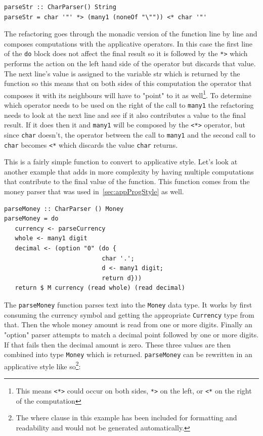 \begin{lstlisting}[frame=tlrb]
parseStr :: CharParser() String
parseStr = char '"' *> (many1 (noneOf "\"")) <* char '"'
\end{lstlisting}

The refactoring goes through the monadic version of the function line by line and composes computations with the applicative operators. In this case the first line of the \texttt{do} block does not affect the final result so it is followed by the \texttt{*>} which performs the action on the left hand side of the operator but discards that value. The next line's value is assigned to the variable str which is returned by the function so this means that on both sides of this computation the operator that composes it with its neighbours will have to "point" to it as well\footnote{This means \texttt{<*>} could occur on both sides, \texttt{*>} on the left, or \texttt{<*} on the right of the computation}. To determine which operator needs to be used on the right of the call to \texttt{many1} the refactoring needs to look at the next line and see if it also contributes a value to the final result. If it does then it and \texttt{many1} will be composed by the \texttt{<*>} operator, but since \texttt{char} doesn't, the operator between the call to \texttt{many1} and the second call to \texttt{char} becomes \texttt{<*} which discards the value \texttt{char} returns.

This is a fairly simple function to convert to applicative style. Let's look at another example that adds in more complexity by having multiple computations that contribute to the final value of the function. This function comes from the money parser that was used in~\ref{sec:appProgStyle} as well. 
\pagebreak
\begin{lstlisting}[frame=tlrb]
parseMoney :: CharParser () Money
parseMoney = do
   currency <- parseCurrency 
   whole <- many1 digit
   decimal <- (option "0" (do { 
                           char '.';
                           d <- many1 digit;
                           return d}))
   return $ M currency (read whole) (read decimal)
\end{lstlisting}

The \texttt{parseMoney} function parses text into the \texttt{Money} data type. It works by first consuming the currency symbol and getting the appropriate \texttt{Currency} type from that. Then the whole money amount is read from one or more digits. Finally an "option" parser attempts to match a decimal point followed by one or more digits. If that fails then the decimal amount is zero. These three values are then combined into type \texttt{Money} which is returned. \texttt{parseMoney} can be rewritten in an applicative style like so\footnote{The where clause in this example has been included for formatting and readability and would not be generated automatically.}:

